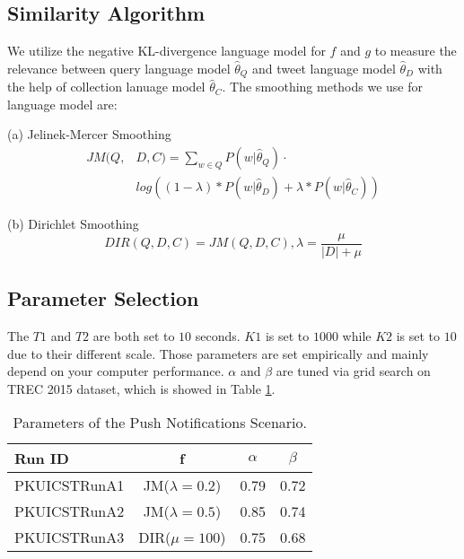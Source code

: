 \subsection{Similarity Algorithm}
We utilize the negative KL-divergence language model for $f$ and $g$ to measure the relevance between
query language model $\widehat{\theta}_Q$ and tweet language model $\widehat{\theta}_D$
with the help of collection lanuage model $\widehat{\theta}_C$.
The smoothing methods we use for language model are:

(a) Jelinek-Mercer Smoothing
\begin{equation}
\begin{aligned}
JM(Q,&D,C) = \sum_{w \in Q} P(w|\widehat{\theta}_Q) \cdot \\
&log \left( (1-\lambda) * P(w|\widehat{\theta}_D) + \lambda * P(w|\widehat{\theta}_C) \right)
\end{aligned}
\end{equation}

(b) Dirichlet Smoothing
\begin{equation}
DIR(Q,D,C) = JM(Q,D,C), \lambda = \frac{\mu}{|D| + \mu}
\end{equation}

\subsection{Parameter Selection}
The $T1$ and $T2$ are both set to $10$ seconds.
$K1$ is set to $1000$ while $K2$ is set to $10$ due to their different scale.
Those parameters are set empirically and mainly depend on your computer performance.
$\alpha$ and $\beta$ are tuned via grid search on TREC 2015 dataset,
which is showed in Table \ref{tab:paraA}.

\begin{table}[htbp]
\centering
\caption{Parameters of the Push Notifications Scenario.}
\label{tab:paraA}
\begin{tabular}{lccc}
\hline
Run ID&f&$\alpha$&$\beta$\\
\hline
PKUICSTRunA1&JM($\lambda=0.2$)&0.79&0.72\\
PKUICSTRunA2&JM($\lambda=0.5$)&0.85&0.74\\
PKUICSTRunA3&DIR($\mu=100$)&0.75&0.68\\
\hline
\end{tabular}
\end{table}


